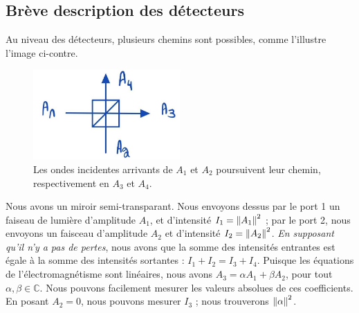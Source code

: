 \documentclass[../notesdecours.tex]{subfiles}
\begin{document}
\subsection{Brève description des détecteurs}
Au niveau des détecteurs, plusieurs chemins sont possibles, comme l'illustre l'image ci-contre.
\begin{center}
\begin{figure}[h]
\centering
\includegraphics[width=0.50\textwidth]{bean.png}
\caption{Les ondes incidentes arrivants de $A_1$ et $A_2$ poursuivent leur chemin, respectivement en $A_3$ et $A_4$.}
\label{Interferometre}
\end{figure}
\end{center}
Nous avons un miroir semi-transparant. Nous envoyons dessus par le port 1 un faiseau de lumière d'amplitude $A_1$, et d'intensité $I_1 = \norm{A_1}^2$ ; par le port 2, nous envoyons un faisceau d'amplitude $A_2$ et d'intensité $I_2 = \norm{A_2}^2$. \emph{En supposant qu'il n'y a pas de pertes}, nous avons que la somme des intensités entrantes est égale à la somme des intensités sortantes : $I_1 + I_2 = I_3 + I_4$. Puisque les équations de l'électromagnétisme sont linéaires, nous avons $A_3 = \alpha A_1 + \beta A_2$, pour tout $\alpha,\beta\in\mathbb{C}$. Nous pouvons facilement mesurer les valeurs absolues de ces coefficients. En posant $A_2 = 0$, nous pouvons mesurer $I_3$ ; nous trouverons $\norm{\alpha}^2$.\\
\end{document}
